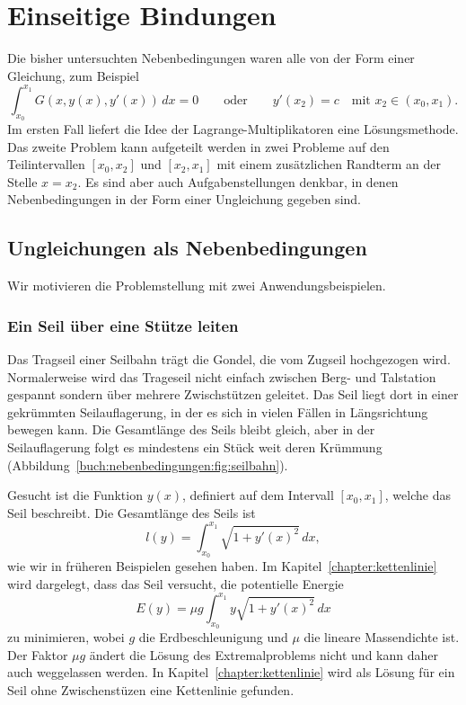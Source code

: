 %
%
%
\section{Einseitige Bindungen
\label{buch:nebenbedingungen:section:einseitigebindungen}}
Die bisher untersuchten Nebenbedingungen waren alle von der
Form einer Gleichung, zum Beispiel 
\[
\int_{x_0}^{x_1} G(x,y(x),y'(x))\,dx = 0
\qquad\text{oder}\qquad
y'(x_2) = c \quad\text{mit $x_2\in (x_0,x_1)$.}
\]
Im ersten Fall liefert die Idee der Lagrange-Multiplikatoren
eine Lösungsmethode.
Das zweite Problem kann aufgeteilt werden in zwei Probleme auf
den Teilintervallen $[x_0,x_2]$ und $[x_2,x_1]$ mit einem zusätzlichen
Randterm an der Stelle $x=x_2$.
Es sind aber auch Aufgabenstellungen denkbar, in denen Nebenbedingungen
in der Form einer Ungleichung gegeben sind.

%
%
\subsection{Ungleichungen als Nebenbedingungen
\label{buch:nebenbedingungen:einseitig:subsection:ungleichungen}}
Wir motivieren die Problemstellung mit zwei Anwendungsbeispielen.

%
%
\subsubsection{Ein Seil über eine Stütze leiten}

Das Tragseil einer Seilbahn trägt die Gondel, die vom Zugseil
hochgezogen wird.
Normalerweise wird das Trageseil nicht einfach zwischen Berg- und Talstation
gespannt sondern über mehrere Zwischstützen geleitet.
Das Seil liegt dort in einer gekrümmten Seilauflagerung, in der es sich
in vielen Fällen in Längsrichtung bewegen kann.
Die Gesamtlänge des Seils bleibt gleich, aber in der Seilauflagerung
folgt es mindestens ein Stück weit deren Krümmung
(Abbildung~\ref{buch:nebenbedingungen:fig:seilbahn}).

Gesucht ist die Funktion $y(x)$, definiert auf dem Intervall $[x_0,x_1]$,
welche das Seil beschreibt.
Die Gesamtlänge des Seils ist 
\[
l(y) = \int_{x_0}^{x_1} \sqrt{1+y'(x)^2}\,dx,
\]
wie wir in früheren Beispielen gesehen haben.
Im Kapitel~\ref{chapter:kettenlinie} wird dargelegt, dass das Seil
versucht, die potentielle Energie
\begin{equation}
E(y) = \mu g \int_{x_0}^{x_1} y\sqrt{1+y'(x)^2}\,dx
\label{buch:nebenbedingungen:einseitig:eqn:seilE}
\end{equation}
zu minimieren, wobei $g$ die Erdbeschleunigung und $\mu$ die
lineare Massendichte ist.
Der Faktor $\mu g$ ändert die Lösung des Extremalproblems nicht und 
kann daher auch weggelassen werden.
In Kapitel~\ref{chapter:kettenlinie} wird als Lösung für ein Seil
ohne Zwischenstüzen eine Kettenlinie gefunden.

